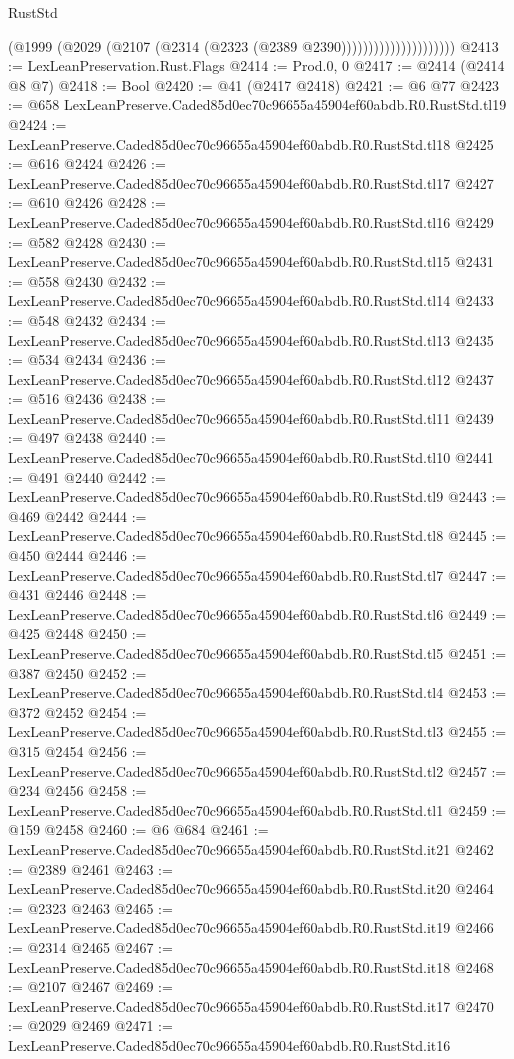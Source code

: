 \begin{lexlean}{RustStd}
\begin{coremodule}
                                  (@1999
                                    (@2029 (@2107 (@2314 (@2323 (@2389 @2390)))))))))))))))))))))
@2413 := LexLeanPreservation.Rust.Flags
@2414 := Prod.{0, 0}
@2417 := @2414 (@2414 @8 @7)
@2418 := Bool
@2420 := @41 (@2417 @2418)
@2421 := @6 @77
@2423 := @658 LexLeanPreserve.Caded85d0ec70c96655a45904ef60abdb.R0.RustStd.tl19
@2424 := LexLeanPreserve.Caded85d0ec70c96655a45904ef60abdb.R0.RustStd.tl18
@2425 := @616 @2424
@2426 := LexLeanPreserve.Caded85d0ec70c96655a45904ef60abdb.R0.RustStd.tl17
@2427 := @610 @2426
@2428 := LexLeanPreserve.Caded85d0ec70c96655a45904ef60abdb.R0.RustStd.tl16
@2429 := @582 @2428
@2430 := LexLeanPreserve.Caded85d0ec70c96655a45904ef60abdb.R0.RustStd.tl15
@2431 := @558 @2430
@2432 := LexLeanPreserve.Caded85d0ec70c96655a45904ef60abdb.R0.RustStd.tl14
@2433 := @548 @2432
@2434 := LexLeanPreserve.Caded85d0ec70c96655a45904ef60abdb.R0.RustStd.tl13
@2435 := @534 @2434
@2436 := LexLeanPreserve.Caded85d0ec70c96655a45904ef60abdb.R0.RustStd.tl12
@2437 := @516 @2436
@2438 := LexLeanPreserve.Caded85d0ec70c96655a45904ef60abdb.R0.RustStd.tl11
@2439 := @497 @2438
@2440 := LexLeanPreserve.Caded85d0ec70c96655a45904ef60abdb.R0.RustStd.tl10
@2441 := @491 @2440
@2442 := LexLeanPreserve.Caded85d0ec70c96655a45904ef60abdb.R0.RustStd.tl9
@2443 := @469 @2442
@2444 := LexLeanPreserve.Caded85d0ec70c96655a45904ef60abdb.R0.RustStd.tl8
@2445 := @450 @2444
@2446 := LexLeanPreserve.Caded85d0ec70c96655a45904ef60abdb.R0.RustStd.tl7
@2447 := @431 @2446
@2448 := LexLeanPreserve.Caded85d0ec70c96655a45904ef60abdb.R0.RustStd.tl6
@2449 := @425 @2448
@2450 := LexLeanPreserve.Caded85d0ec70c96655a45904ef60abdb.R0.RustStd.tl5
@2451 := @387 @2450
@2452 := LexLeanPreserve.Caded85d0ec70c96655a45904ef60abdb.R0.RustStd.tl4
@2453 := @372 @2452
@2454 := LexLeanPreserve.Caded85d0ec70c96655a45904ef60abdb.R0.RustStd.tl3
@2455 := @315 @2454
@2456 := LexLeanPreserve.Caded85d0ec70c96655a45904ef60abdb.R0.RustStd.tl2
@2457 := @234 @2456
@2458 := LexLeanPreserve.Caded85d0ec70c96655a45904ef60abdb.R0.RustStd.tl1
@2459 := @159 @2458
@2460 := @6 @684
@2461 := LexLeanPreserve.Caded85d0ec70c96655a45904ef60abdb.R0.RustStd.it21
@2462 := @2389 @2461
@2463 := LexLeanPreserve.Caded85d0ec70c96655a45904ef60abdb.R0.RustStd.it20
@2464 := @2323 @2463
@2465 := LexLeanPreserve.Caded85d0ec70c96655a45904ef60abdb.R0.RustStd.it19
@2466 := @2314 @2465
@2467 := LexLeanPreserve.Caded85d0ec70c96655a45904ef60abdb.R0.RustStd.it18
@2468 := @2107 @2467
@2469 := LexLeanPreserve.Caded85d0ec70c96655a45904ef60abdb.R0.RustStd.it17
@2470 := @2029 @2469
@2471 := LexLeanPreserve.Caded85d0ec70c96655a45904ef60abdb.R0.RustStd.it16

\end{coremodule}
\end{lexlean}
